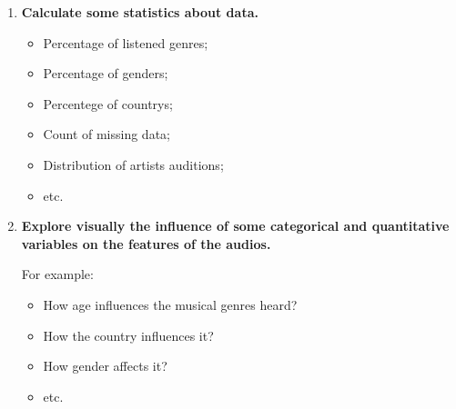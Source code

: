 \documentclass{article}
\begin{document}
\begin{enumerate}
        \item{\textbf{Calculate some statistics about data.}}
        
            \begin{itemize}
                \item Percentage of listened genres;
                \item Percentage of genders;
                \item Percentege of countrys;
                \item Count of missing data;
                \item Distribution of artists auditions;
                \item etc.
            \end{itemize}

        \item{\textbf{Explore visually the influence of some categorical
        and quantitative variables on the features of the audios.}}
        
            For example:

            \begin{itemize}
                \item How age influences the musical genres heard?
                \item How the country influences it?
                \item How gender affects it?
                \item etc.
            \end{itemize}

        \end{enumerate}
\end{document}
